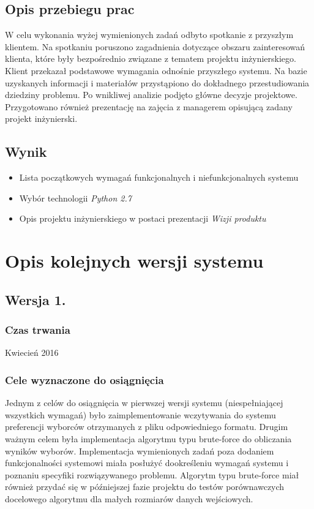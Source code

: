 \documentclass[pdflatex,11pt]{../aghdoc_version2}
\begin{document}
\subsection{Opis przebiegu prac}
W celu wykonania wyżej wymienionych zadań odbyto spotkanie z przyszłym klientem. Na
spotkaniu poruszono zagadnienia dotyczące obszaru zainteresowań klienta, które były
bezpośrednio związane z tematem projektu inżynierskiego. Klient przekazał podstawowe wymagania odnośnie przyszłego systemu. Na bazie uzyskanych informacji i materiałów
przystąpiono do dokładnego przestudiowania dziedziny problemu. Po wnikliwej analizie
podjęto główne decyzje projektowe. Przygotowano również prezentację na zajęcia z
managerem opisującą zadany projekt inżynierski.
\subsection{Wynik}
\begin{itemize}
\item Lista początkowych wymagań funkcjonalnych i niefunkcjonalnych systemu
\item Wybór technologii \textit{Python 2.7}
\item Opis projektu inżynierskiego w postaci prezentacji \textit{Wizji produktu}
\end{itemize}

\section{Opis kolejnych wersji systemu}
\subsection{Wersja 1.}
\subsubsection{Czas trwania}
Kwiecień 2016
\subsubsection{Cele wyznaczone do osiągnięcia}
Jednym z celów do osiągnięcia w pierwszej wersji systemu (niespełniającej wszystkich
wymagań) było zaimplementowanie wczytywania do systemu preferencji wyborców
otrzymanych z pliku odpowiedniego formatu. Drugim ważnym celem była implementacja
algorytmu typu brute-force do obliczania wyników wyborów. Implementacja wymienionych
zadań poza dodaniem funkcjonalności systemowi miała posłużyć dookreśleniu wymagań
systemu i poznaniu specyfiki rozwiązywanego problemu. Algorytm typu brute-force miał
również przydać się w późniejszej fazie projektu do testów porównawczych docelowego
algorytmu dla małych rozmiarów danych wejściowych.
\end{document}
